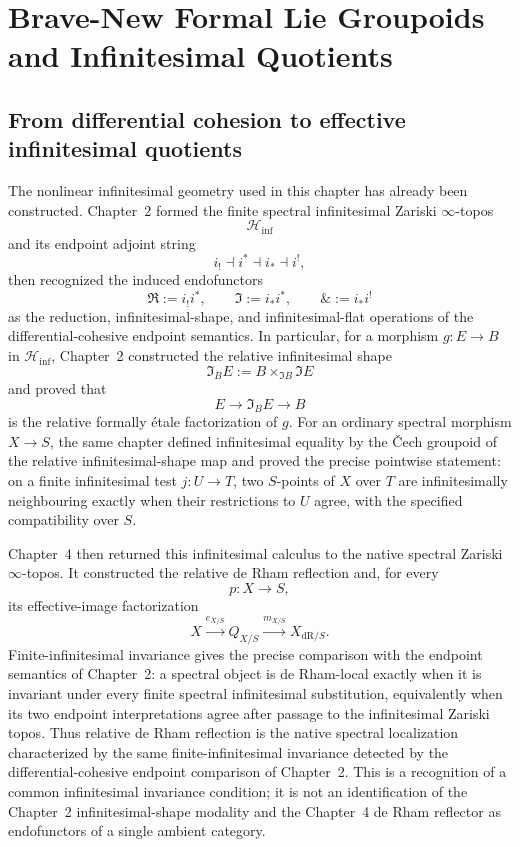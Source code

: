 \chapter{Brave-New Formal Lie Groupoids and Infinitesimal Quotients}
\label{ch:formal-lie-groupoids}

\section{From differential cohesion to effective infinitesimal quotients}
\label{sec:flg-purpose}

The nonlinear infinitesimal geometry used in this chapter has already been
constructed.  Chapter~2 formed the finite spectral infinitesimal Zariski
$\infty$-topos
\[
    \mathcal H_{\inf}
\]
and its endpoint adjoint string
\[
    i_!\dashv i^*\dashv i_*\dashv i^!,
\]
then recognized the induced endofunctors
\[
    \Re:=i_!i^*,
    \qquad
    \Im:=i_*i^*,
    \qquad
    \&:=i_*i^!
\]
as the reduction, infinitesimal-shape, and infinitesimal-flat operations of the
differential-cohesive endpoint semantics.  In particular, for a morphism
$g:E\to B$ in $\mathcal H_{\inf}$, Chapter~2 constructed the relative
infinitesimal shape
\[
    \Im_BE
    :=
    B\times_{\Im B}\Im E
\]
and proved that
\[
    E\longrightarrow \Im_BE\longrightarrow B
\]
is the relative formally \'etale factorization of $g$.  For an ordinary spectral morphism
$X\to S$, the same chapter defined infinitesimal equality by the \v{C}ech
groupoid of the relative infinitesimal-shape map and proved the precise
pointwise statement: on a finite infinitesimal test $j:U\to T$, two
$S$-points of $X$ over $T$ are infinitesimally neighbouring exactly when
their restrictions to $U$ agree, with the specified compatibility over $S$.

Chapter~4 then returned this infinitesimal calculus to the native
spectral Zariski $\infty$-topos.  It constructed the relative de Rham
reflection and, for every
\[
    p:X\longrightarrow S,
\]
its effective-image factorization
\[
    X
    \xrightarrow{e_{X/S}}
    Q_{X/S}
    \xrightarrow{m_{X/S}}
    X_{\mathrm{dR}/S}.
\]
Finite-infinitesimal invariance gives the precise comparison with the
endpoint semantics of Chapter~2: a spectral object is de Rham-local exactly
when it is invariant under every finite spectral infinitesimal substitution,
equivalently when its two endpoint interpretations agree after passage to
the infinitesimal Zariski topos.  Thus relative de Rham reflection is the
native spectral localization characterized by the same finite-infinitesimal
invariance detected by the differential-cohesive endpoint comparison of
Chapter~2.  This is a recognition of a common infinitesimal invariance
condition; it is not an identification of the Chapter~2 infinitesimal-shape
modality and the Chapter~4 de Rham reflector as endofunctors of a single
ambient category.

